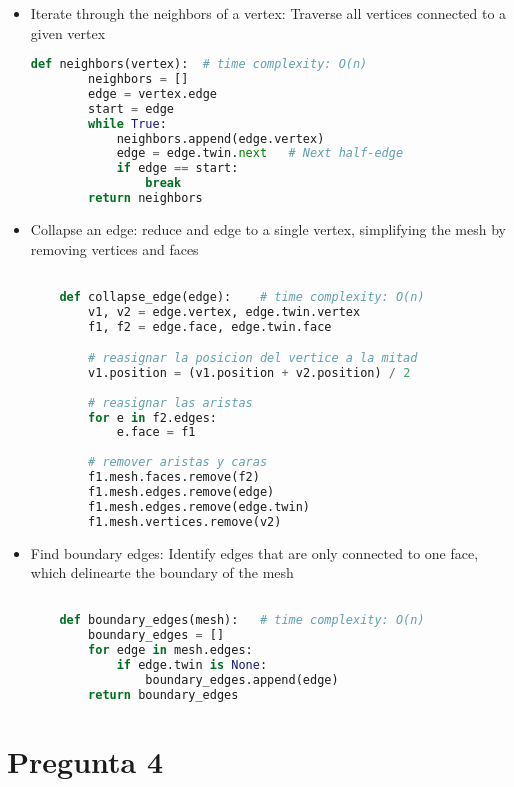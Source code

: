 \documentclass{article}
\begin{document}
\begin{itemize}
    \item Iterate through the neighbors of a vertex: Traverse all vertices connected to a given vertex
    \begin{lstlisting}[language=Python]
    def neighbors(vertex):  # time complexity: O(n)
        neighbors = []
        edge = vertex.edge
        start = edge
        while True:
            neighbors.append(edge.vertex)
            edge = edge.twin.next   # Next half-edge
            if edge == start:
                break
        return neighbors
    \end{lstlisting}
    \item Collapse an edge: reduce and edge to a single vertex, simplifying the mesh by removing vertices and faces
    \begin{lstlisting}[language=Python]

    def collapse_edge(edge):    # time complexity: O(n)
        v1, v2 = edge.vertex, edge.twin.vertex
        f1, f2 = edge.face, edge.twin.face

        # reasignar la posicion del vertice a la mitad
        v1.position = (v1.position + v2.position) / 2
        
        # reasignar las aristas
        for e in f2.edges:
            e.face = f1
        
        # remover aristas y caras
        f1.mesh.faces.remove(f2)
        f1.mesh.edges.remove(edge)
        f1.mesh.edges.remove(edge.twin)
        f1.mesh.vertices.remove(v2)

    \end{lstlisting}
    \item Find boundary edges: Identify edges that are only connected to one face, which delinearte the boundary of the mesh
    \begin{lstlisting}[language=Python]

    def boundary_edges(mesh):   # time complexity: O(n)
        boundary_edges = []
        for edge in mesh.edges:
            if edge.twin is None:
                boundary_edges.append(edge)
        return boundary_edges
    \end{lstlisting}
\end{itemize}

\section{Pregunta 4}
\end{document}
